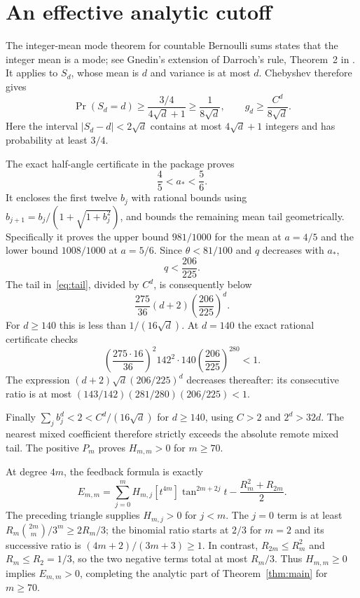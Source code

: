 \documentclass[11pt,a4paper]{article}
\theoremstyle{remark}\newtheorem*{ednote}{Editorial note (ProveIt, 2026-10-01)}
\begin{document}
\section{An effective analytic cutoff}
The integer-mean mode theorem for countable Bernoulli sums states that the integer mean is a mode; see Gnedin's extension of Darroch's rule, Theorem~2 in \cite{gnedin}. It applies to $S_d$, whose mean is $d$ and variance is at most $d$. Chebyshev therefore gives
\[
 \Pr(S_d=d)\ge\frac{3/4}{4\sqrt d+1}\ge\frac1{8\sqrt d},
 \qquad g_d\ge\frac{C^d}{8\sqrt d}.
\]
Here the interval $|S_d-d|<2\sqrt d$ contains at most $4\sqrt d+1$ integers and has probability at least $3/4$.

The exact half-angle certificate in the package proves
\[
 \frac45<a_*<\frac56.
\]
It encloses the first twelve $b_j$ with rational bounds using $b_{j+1}=b_j/(1+\sqrt{1+b_j^2})$, and bounds the remaining mean tail geometrically. Specifically it proves the upper bound $981/1000$ for the mean at $a=4/5$ and the lower bound $1008/1000$ at $a=5/6$. Since $\theta<81/100$ and $q$ decreases with $a_*$,
\[
 q<\frac{206}{225}.
\]
The tail in~\eqref{eq:tail}, divided by $C^d$, is consequently below
\[
 \frac{275}{36}(d+2)\left(\frac{206}{225}\right)^d.
\]
For $d\ge140$ this is less than $1/(16\sqrt d)$. At $d=140$ the exact rational certificate checks
\[
 \left(\frac{275\cdot16}{36}\right)^2 142^2\cdot140
 \left(\frac{206}{225}\right)^{280}<1.
\]
The expression $(d+2)\sqrt d(206/225)^d$ decreases thereafter: its consecutive ratio is at most $(143/142)(281/280)(206/225)<1$.

Finally $\sum_jb_j^d<2<C^d/(16\sqrt d)$ for $d\ge140$, using $C>2$ and $2^d>32d$. The nearest mixed coefficient therefore strictly exceeds the absolute remote mixed tail. The positive $P_m$ proves $H_{m,m}>0$ for $m\ge70$.

At degree $4m$, the feedback formula is exactly
\begin{equation}\label{eq:pressure}
 E_{m,m}=\sum_{j=0}^mH_{m,j}[t^{4m}]\tan^{2m+2j}t
                  -\frac{R_m^2+R_{2m}}2.
\end{equation}
The preceding triangle supplies $H_{m,j}>0$ for $j<m$. The $j=0$ term is at least $R_m\binom{2m}{m}/3^m\ge2R_m/3$; the binomial ratio starts at $2/3$ for $m=2$ and its successive ratio is $(4m+2)/(3m+3)\ge1$. In contrast, $R_{2m}\le R_m^2$ and $R_m\le R_2=1/3$, so the two negative terms total at most $R_m/3$. Thus $H_{m,m}\ge0$ implies $E_{m,m}>0$, completing the analytic part of Theorem~\ref{thm:main} for $m\ge70$.
\end{document}
